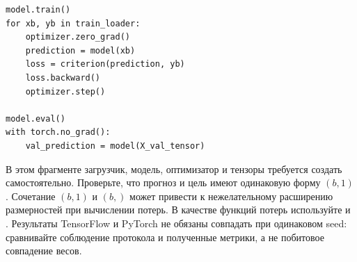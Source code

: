 \begin{lstlisting}
model.train()
for xb, yb in train_loader:
    optimizer.zero_grad()
    prediction = model(xb)
    loss = criterion(prediction, yb)
    loss.backward()
    optimizer.step()

model.eval()
with torch.no_grad():
    val_prediction = model(X_val_tensor)
\end{lstlisting}

В этом фрагменте загрузчик, модель, оптимизатор и тензоры требуется
создать самостоятельно. Проверьте, что прогноз и цель имеют одинаковую
форму \((b,1)\). Сочетание \((b,1)\) и \((b,)\) может привести
к нежелательному расширению размерностей при вычислении потерь.
В качестве функций потерь используйте  и .
Результаты TensorFlow и PyTorch не обязаны совпадать при одинаковом seed:
сравнивайте соблюдение протокола и полученные метрики, а не побитовое
совпадение весов.
